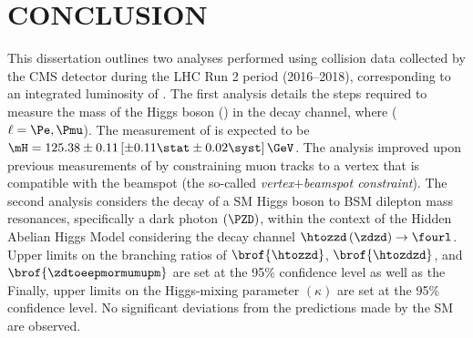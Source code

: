 \chapter{CONCLUSION}
\label{ch:conclusion}
This dissertation outlines two analyses performed using \pp collision data collected by the CMS detector during the LHC Run 2 period (2016--2018), corresponding to an integrated luminosity of \lumiruntwo.
The first analysis details the steps required to measure the mass of the Higgs boson (\mH) in the \hzzfourl decay channel, where ($\ell = \Pe, \Pmu$).
The measurement of \mH is expected to be $\mH = 125.38 \pm 0.11 \left[\pm 0.11 \stat \pm 0.02\syst \right] \GeV$.  %
The analysis improved upon previous measurements of \mH by constraining muon tracks to a vertex that is compatible with the beamspot (the so-called \emph{vertex$+$beamspot constraint}).
The second analysis considers the decay of a SM Higgs boson to BSM dilepton mass resonances, specifically a dark photon $\left( \PZD \right)$, within the context of the Hidden Abelian Higgs Model considering the decay channel $\htozzd \left( \zdzd \right) \to \fourl$.
Upper limits on the branching ratios of $\brof{\htozzd}$, $\brof{\htozdzd}$, and $\brof{\zdtoeepmormumupm}$ are set at the 95\% confidence level as well as the 
Finally, upper limits on the Higgs-mixing parameter $(\kappa)$ are set at the 95\% confidence level.
No significant deviations from the predictions made by the SM are observed.